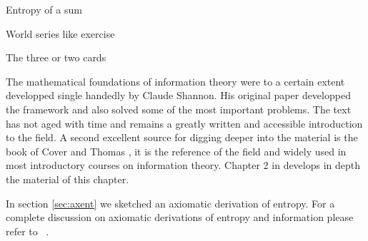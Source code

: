 \begin{exercise}
Entropy of a sum 
\end{exercise}
\begin{exercise}
World series like exercise
\end{exercise}
\begin{exercise}
The three or two cards
\end{exercise}
The mathematical foundations of information theory were to a certain extent developped single handedly by Claude Shannon. His original paper \cite{Shannon_48} developped the framework and also solved some of the most important problems. The text has not aged with time and remains a greatly written and accessible introduction to the field. A second excellent source for digging deeper into the material is the book of Cover and Thomas \cite{Cover_91}, it is the reference of the field and widely used in most introductory courses on information theory. Chapter 2 in \cite{Cover_91} develops in depth the material of this chapter.

In section \ref{sec:axent} we sketched an axiomatic derivation of entropy. For a complete discussion on axiomatic derivations of entropy and information please refer to~ \cite{Aczel_74,Aczel_75,Csiszar_08,Feinstein_58}. 
